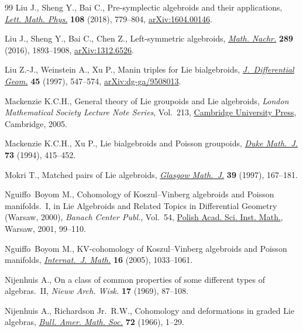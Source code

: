\begin{thebibliography}{99}
Liu J., Sheng Y., Bai C., Pre-symplectic algebroids and their applications,
 \href{https://doi.org/10.1007/s11005-017-0973-8}{\textit{Lett. Math. Phys.}} \textbf{108} (2018), 779--804,
 \href{https://arxiv.org/abs/1604.00146}{arXiv:1604.00146}.

Liu J., Sheng Y., Bai C., Chen Z., Left-symmetric algebroids, \href{https://doi.org/10.1002/mana.201300339}{\textit{Math.
 Nachr.}} \textbf{289} (2016), 1893--1908, \href{https://arxiv.org/abs/1312.6526}{arXiv:1312.6526}.

Liu Z.-J., Weinstein A., Xu P., Manin triples for {L}ie bialgebroids,
 \href{https://doi.org/10.4310/jdg/1214459842}{\textit{J.~Differential Geom.}} \textbf{45} (1997), 547--574,
 \href{https://arxiv.org/abs/dg-ga/9508013}{arXiv:dg-ga/9508013}.

Mackenzie K.C.H., General theory of {L}ie groupoids and {L}ie algebroids,
 \textit{London Mathematical Society Lecture Note Series}, Vol.~213, \href{https://doi.org/10.1017/CBO9781107325883}{Cambridge
 University Press}, Cambridge, 2005.

Mackenzie K.C.H., Xu P., Lie bialgebroids and {P}oisson groupoids, \href{https://doi.org/10.1215/S0012-7094-94-07318-3}{\textit{Duke
 Math.~J.}} \textbf{73} (1994), 415--452.

Mokri T., Matched pairs of {L}ie algebroids, \href{https://doi.org/10.1017/S0017089500032055}{\textit{Glasgow Math.~J.}}
 \textbf{39} (1997), 167--181.

Nguiffo~Boyom M., Cohomology of {K}oszul--{V}inberg algebroids and {P}oisson
 manifolds.~{I}, in Lie Algebroids and Related Topics in Differential Geometry
 ({W}arsaw, 2000), \textit{Banach Center Publ.}, Vol.~54, \href{https://doi.org/10.4064/bc54-0-7}{Polish Acad. Sci.
 Inst. Math.}, Warsaw, 2001, 99--110.

Nguiffo~Boyom M., K{V}-cohomology of {K}oszul--{V}inberg algebroids and
 {P}oisson manifolds, \href{https://doi.org/10.1142/S0129167X0500320X}{\textit{Internat.~J. Math.}} \textbf{16} (2005),
 1033--1061.

Nijenhuis A., On a class of common properties of some different types of
 algebras.~{II}, \textit{Nieuw Arch. Wisk.} \textbf{17} (1969), 87--108.

Nijenhuis A., Richardson Jr.~R.W., Cohomology and deformations in graded {L}ie
 algebras, \href{https://doi.org/10.1090/S0002-9904-1966-11401-5}{\textit{Bull. Amer. Math. Soc.}} \textbf{72} (1966), 1--29.


\end{thebibliography}
